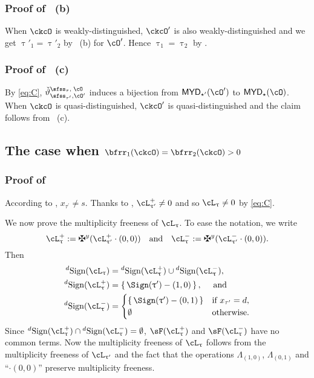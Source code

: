 \documentclass[12pt,a4paper]{amsart}
\def\MYD{{\mathsf{MYD}}}
\numberwithin{equation}{section}
\theoremstyle{remark}
\def\cOp{\cO^{\prime}}
\def\uptaup{\uptau^{\prime}}
\def\taup{\tau^{\prime}}
\begin{document}
\subsubsection*{Proof of ~(b)}
When $\ckcO$ is weakly-distinguished, $\ckcO'$ is also weakly-distinguished and we get $\uptau'_{1}=\uptau'_{2}$ by
~(b) for $\cOp$. Hence $\uptau_{1}=\uptau_{2}$ by .


\subsubsection*{Proof of ~(c)}
By \eqref{eq:C},  $\dlifttso$ induces a bijection from $\MYD_{\star'}(\cO')$ to
$\MYD_{\star}(\cO)$.
When $\ckcO$ is quasi-distinguished, $\ckcO'$ is quasi-distinguished
and the claim follows from
~(c).

\subsection*{The case when $\bfrr_{1}(\ckcO)=\bfrr_{2}(\ckcO)>0$}

\subsubsection*{Proof of }
According to ,  $x_{\taup}\neq s$.
Thanks to , $\pac{\uptaup} \neq 0$ and so $\ac_{\uptau}\neq 0$ by \eqref{eq:C}.

We now prove the multiplicity freeness of $\ac_{\uptau}$.
To ease the notation, we write
\[
 \pac{\uptau}:=\maltese^y (\pac{\uptau'}\cdot (0,0)) \AND
 \nac{\uptau}:=\maltese^y (\nac{\uptau'}\cdot (0,0)).
\]
Then
\begin{equation}
\label{eq:dsign1}
 \begin{split}
\dsign(\ac_{\uptau}) & = \dsign(\pac{\uptau})\cup \dsign(\nac{\uptau}), \\
\dsign(\pac{\uptau}) & = \set{\Sign(\uptau') - (1,0)}, \quad \text{ and }\\
\dsign(\nac{\uptau}) & =
\begin{cases}
\set{\Sign(\uptau') - (0,1)} & \text{if }  x_{\taup} =d, \\
\emptyset & \text{otherwise}. \\
\end{cases}
\end{split}
\end{equation}
Since $\dsign(\pac{\uptau})\cap \dsign(\nac{\uptau})=\emptyset$,
$\sF(\pac{\uptau})$ and $\sF(\nac{\uptau})$ have no common terms. Now the
multiplicity freeness of $\ac_{\uptau}$ follows from the multiplicity freeness
of $\ac_{\uptau'}$ and the fact that the operations $\Lambda_{(1,0)}$,
$\Lambda_{(0,1)}$ and ``$\cdot (0,0)$'' preserve
multiplicity freeness.
\end{document}

